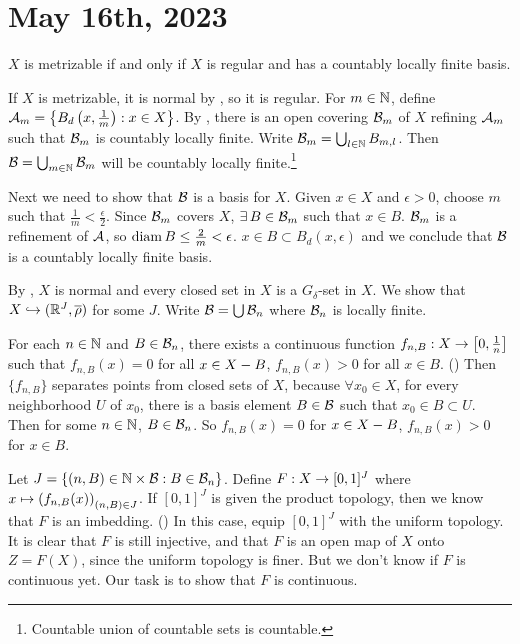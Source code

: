 \section*{May 16th, 2023}

  \(X\) is metrizable if and only if \(X\) is regular and has a countably locally finite basis.

\pf \note{\mimp} If \(X\) is metrizable, it is normal by , so it is regular. For \(m \in \mathbb{N}\), define \(\mathcal{A}_m = \left\{B_d\left( x, \frac{1}{m} \right) : x \in X\right\}\). By , there is an open covering \(\mathcal{B}_m\) of \(X\) refining \(\mathcal{A}_m\) such that \(\mathcal{B}_m\) is countably locally finite. Write \(\mathcal{B}_m = \bigcup_{l \in \mathbb{N}} B_{m, l}\). Then \(\mathcal{B} = \bigcup_{m \in \mathbb{N}} \mathcal{B}_m\) will be countably locally finite.\footnote{Countable union of countable sets is countable.}

Next we need to show that \(\mathcal{B}\) is a basis for \(X\). Given \(x \in X\) and \(\epsilon > 0\), choose \(m\) such that \(\frac{1}{m} < \frac{\epsilon}{2}\). Since \(\mathcal{B}_m\) covers \(X\), \(\exists B \in \mc{B}_m\) such that \(x \in B\). \(\mathcal{B}_m\) is a refinement of \(\mathcal{A}\), so \(\operatorname{diam} B \leq \frac{2}{m} < \epsilon\). \(x \in B \subset B_d(x, \epsilon)\) and we conclude that \(\mathcal{B}\) is a countably locally finite basis.

\note{\mimpd} By , \(X\) is normal and every closed set in \(X\) is a \(G_\delta\)-set in \(X\). We show that \(X \hookrightarrow (\mathbb{R}^J, \overline{\rho})\) for some \(J\). Write \(\mathcal{B} = \bigcup \mathcal{B}_n\) where \(\mathcal{B}_n\) is locally finite.

For each \(n \in \mathbb{N}\) and \(B \in \mathcal{B}_n\), there exists a continuous function \(f_{n, B}: X \rightarrow \left[0, \frac{1}{n}\right]\) such that \(f_{n, B}(x) = 0\) for all \(x \in X - B\), \(f_{n, B}(x) > 0\) for all \(x \in B\). () Then \(\{f_{n, B}\}\) separates points from closed sets of \(X\), because \(\forall x_0 \in X\), for every neighborhood \(U\) of \(x_0\), there is a basis element \(B \in \mathcal{B}\) such that \(x_0 \in B \subset U\). Then for some \(n \in \mathbb{N}\), \(B \in \mathcal{B}_n\). So \(f_{n, B}(x) = 0\) for \(x \in X - B\), \(f_{n, B}(x) > 0\) for \(x \in B\).

Let \(J = \{(n, B) \in \mathbb{N} \times \mathcal{B} : B \in \mathcal{B}_n\}\). Define \(F: X \rightarrow [0, 1]^J\) where \(x \mapsto \left( f_{n, B}(x) \right)_{(n, B) \in J}\). If \([0, 1]^J\) is given the product topology, then we know that \(F\) is an imbedding. () In this case, equip \([0, 1]^J\) with the uniform topology. It is clear that \(F\) is still injective, and that \(F\) is an open map of \(X\) onto \(Z = F(X)\), since the uniform topology is finer. But we don't know if \(F\) is continuous yet. Our task is to show that \(F\) is continuous.

